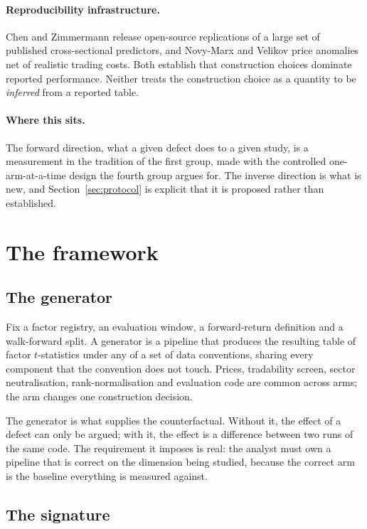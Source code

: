 \documentclass[11pt]{article}
\begin{document}
\paragraph{Reproducibility infrastructure.} Chen and Zimmermann \cite{chen2022} release
open-source replications of a large set of published cross-sectional predictors, and
Novy-Marx and Velikov \cite{novymarx2016} price anomalies net of realistic trading costs.
Both establish that construction choices dominate reported performance. Neither treats the
construction choice as a quantity to be \emph{inferred} from a reported table.

\paragraph{Where this sits.} The forward direction, what a given defect does to a given
study, is a measurement in the tradition of the first group, made with the controlled
one-arm-at-a-time design the fourth group argues for. The inverse direction is what is new,
and Section~\ref{sec:protocol} is explicit that it is proposed rather than established.

\section{The framework}
\label{sec:framework}

\subsection{The generator}

Fix a factor registry, an evaluation window, a forward-return definition and a
walk-forward split. A generator is a pipeline that produces the resulting table of factor
$t$-statistics under any of a set of data conventions, sharing every component that the
convention does not touch. Prices, tradability screen, sector neutralisation,
rank-normalisation and evaluation code are common across arms; the arm changes one
construction decision.

The generator is what supplies the counterfactual. Without it, the effect of a defect can
only be argued; with it, the effect is a difference between two runs of the same code.
The requirement it imposes is real: the analyst must own a pipeline that is correct on the
dimension being studied, because the correct arm is the baseline everything is measured
against.

\subsection{The signature}
\end{document}
